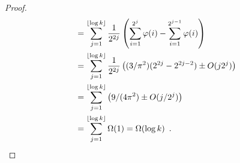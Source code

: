 \documentclass{patmorin}
\newcommand{\n}{N}
\DeclareMathOperator{\crs}{cr}
\begin{document}
\begin{proof}
\begin{align*}
      &= \sum_{j=1}^{\lfloor\log k\rfloor}\frac{1}{2^{2j}}
             \left(\sum_{i=1}^{2^j}\varphi(i)-\sum_{i=1}^{2^{j-1}} \varphi(i)\right)  \\
      &= \sum_{j=1}^{\lfloor\log k\rfloor}\frac{1}{2^{2j}}
             \left((3/\pi^2)(2^{2j}-2^{2j-2})\pm O(j2^j)\right)  \\
      &= \sum_{j=1}^{\lfloor\log k\rfloor}
             \left(9/(4\pi^2)\pm O(j/2^{j})\right)  \\
      &= \sum_{j=1}^{\lfloor\log k\rfloor} \Omega(1) = \Omega(\log k) \enspace . \qedhere
  \end{align*}
\end{proof}


%
%
%
\end{document}
